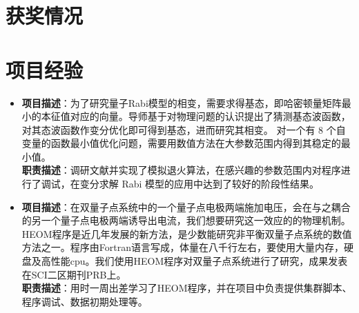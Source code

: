 \documentclass{resume}
\begin{document}
\section{获奖情况}

\section{项目经验}
\begin{itemize}%
\item
{}
\textbf{项目描述}：为了研究量子Rabi模型的相变，需要求得基态，即哈密顿量矩阵最小的本征值对应的向量。导师基于对物理问题的认识提出了猜测基态波函数，对其态波函数作变分优化即可得到基态，进而研究其相变。 对一个有 8 个自变量的函数最小值优化问题，需要用数值方法在大参数范围内得到其稳定的最小值。\\
\textbf{职责描述}：调研文献并实现了模拟退火算法，在感兴趣的参数范围内对程序进行了调试，在变分求解 Rabi 模型的应用中达到了较好的阶段性结果。
\item  {}
\textbf{项目描述}：在双量子点系统中的一个量子点电极两端施加电压，会在与之耦合的另一个量子点电极两端诱导出电流，我们想要研究这一效应的的物理机制。HEOM程序是近几年发展的新方法，是少数能研究非平衡双量子点系统的数值方法之一。程序由Fortran语言写成，体量在八千行左右，要使用大量内存，硬盘及高性能cpu。我们使用HEOM程序对双量子点系统进行了研究，成果发表在SCI二区期刊PRB上。\\
\textbf{职责描述}：用时一周出差学习了HEOM程序，并在项目中负责提供集群脚本、程序调试、数据初期处理等。


\end{itemize}
\end{document}

